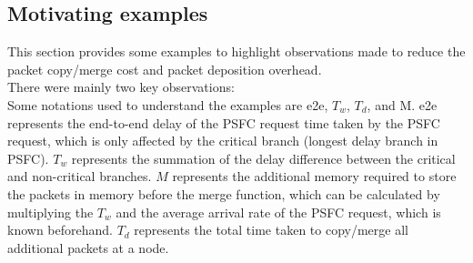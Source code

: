 \documentclass[journal]{IEEEtran}
\begin{document}
\subsection{Motivating examples}
This section provides some examples to highlight observations made to reduce the packet copy/merge cost and packet deposition overhead.\\ There were mainly two key observations: \\
Some notations used to understand the examples are e2e, $T_w$, $T_d$, and M. e2e represents the end-to-end delay of the PSFC request time taken by the PSFC request, which is only affected by the critical branch (longest delay branch in PSFC). $T_w$ represents the summation of the delay difference between the critical and non-critical branches. $M$ represents the additional memory required to store the packets in memory before the merge function, which can be calculated by multiplying the $T_w$ and the average arrival rate of the PSFC request, which is known beforehand. $T_d$ represents the total time taken to copy/merge all additional packets at a node.\\
\end{document}
